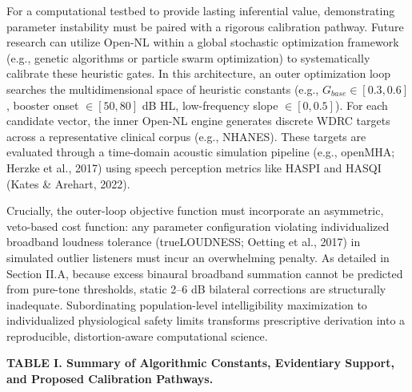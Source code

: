 \documentclass[
  12pt,
]{article}
\begin{document}
For a computational testbed to provide lasting inferential value,
demonstrating parameter instability must be paired with a rigorous
calibration pathway. Future research can utilize Open-NL within a global
stochastic optimization framework (e.g., genetic algorithms or particle
swarm optimization) to systematically calibrate these heuristic gates.
In this architecture, an outer optimization loop searches the
multidimensional space of heuristic constants (e.g.,
\(G_{base} \in [0.3, 0.6]\), booster onset \(\in [50, 80]\) dB HL,
low-frequency slope \(\in [0, 0.5]\)). For each candidate vector, the
inner Open-NL engine generates discrete WDRC targets across a
representative clinical corpus (e.g., NHANES). These targets are
evaluated through a time-domain acoustic simulation pipeline (e.g.,
openMHA; Herzke et al., 2017) using speech perception metrics like HASPI
and HASQI (Kates \& Arehart, 2022).

Crucially, the outer-loop objective function must incorporate an
asymmetric, veto-based cost function: any parameter configuration
violating individualized broadband loudness tolerance (trueLOUDNESS;
Oetting et al., 2017) in simulated outlier listeners must incur an
overwhelming penalty. As detailed in Section II.A, because excess
binaural broadband summation cannot be predicted from pure-tone
thresholds, static 2--6 dB bilateral corrections are structurally
inadequate. Subordinating population-level intelligibility maximization
to individualized physiological safety limits transforms prescriptive
derivation into a reproducible, distortion-aware computational science.

\textbf{TABLE I. Summary of Algorithmic Constants, Evidentiary Support,
and Proposed Calibration Pathways.}
\end{document}
